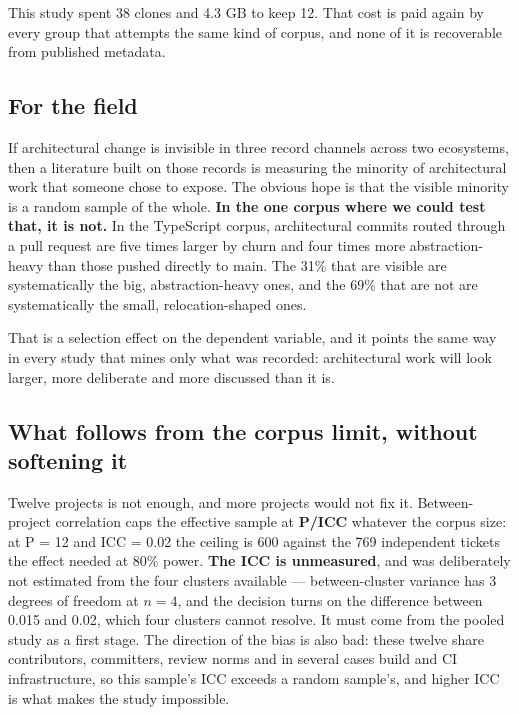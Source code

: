 \documentclass[11pt,a4paper]{article}
\begin{document}
This study spent 38 clones and 4.3 GB to keep 12. That cost is paid again by every group that attempts the same kind of corpus, and none of it is recoverable from published metadata.

\subsection{For the field}
\label{sec:7.3}

If architectural change is invisible in three record channels across two ecosystems, then a literature built on those records is measuring the minority of architectural work that someone chose to expose. The obvious hope is that the visible minority is a random sample of the whole. \textbf{In the one corpus where we could test that, it is not.} In the TypeScript corpus, architectural commits routed through a pull request are five times larger by churn and four times more abstraction-heavy than those pushed directly to main. The 31\% that are visible are systematically the big, abstraction-heavy ones, and the 69\% that are not are systematically the small, relocation-shaped ones.

That is a selection effect on the dependent variable, and it points the same way in every study that mines only what was recorded: architectural work will look larger, more deliberate and more discussed than it is.

\subsection{What follows from the corpus limit, without softening it}
\label{sec:7.4}

Twelve projects is not enough, and more projects would not fix it. Between-project correlation caps the effective sample at \textbf{P/ICC} whatever the corpus size: at P = 12 and ICC = 0.02 the ceiling is 600 against the 769 independent tickets the effect needed at 80\% power. \textbf{The ICC is unmeasured}, and was deliberately not estimated from the four clusters available --- between-cluster variance has 3 degrees of freedom at $n = 4$, and the decision turns on the difference between 0.015 and 0.02, which four clusters cannot resolve. It must come from the pooled study as a first stage. The direction of the bias is also bad: these twelve share contributors, committers, review norms and in several cases build and CI infrastructure, so this sample's ICC exceeds a random sample's, and higher ICC is what makes the study impossible.
\end{document}
